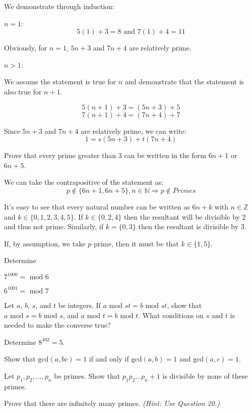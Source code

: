 \documentclass[11pt,largemargins]{homework}
\begin{document}
\quad We demonstrate through induction:

\quad $n=1$:
$$5(1)+3=8\text{ and } 7(1)+4=11$$

\quad Obviously, for $n=1$, $5n+3$ and $7n+4$ are relatively prime.

\quad $n>1$:

\quad We assume the statement is true for $n$ and demonstrate that the statement is also true for $n+1$.

$$5(n+1)+3 = (5n+3)+5$$
$$7(n+1)+4 = (7n+4)+7$$

\quad Since $5n+3$ and $7n+4$ are relatively prime, we can write:
$$1 = s(5n+3)+t(7n+4)$$

\question 
Prove that every prime greater than 3 can be written in the form $6n+1$ or $6n+5$.

\quad We can take the contrapositive of the statement as:
$$p \notin \{6n+1, 6n+5\}, n\in\mathbb{N} \Rightarrow p \notin Primes$$

\quad It's easy to see that every natural number can be written as $6n+k$ with $n \in \mathbb{Z}$ and 
$k \in \{0,1,2,3,4,5\}$. If $k\in\{0,2,4\}$ then the resultant will be divisible by 2 and thus not prime.
Similarly, if $k=\{0,3\}$ then the resultant is divisible by 3.

\quad If, by assumption, we take $p$ prime, then it must be that $k\in\{1,5\}$.

\question 
Determine 

\begin{alphaparts}
    \questionpart 
    $7^{1000} = \text{ mod }6$

    \questionpart 
    $6^{1001} = \text{ mod }7$
\end{alphaparts}

\question 
Let $a$, $b$, $s$, and $t$ be integers. If $a\text{ mod }st=b\text{ mod }st$, show that 
$a\text{ mod }s=b\text{ mod }s$, and $a\text{ mod }t=b\text{ mod }t$. What conditions on $s$ and $t$ 
is needed to make the converse true?

\question 
Determine $8^{402}=5$.

\question 
Show that $\text{gcd}(a,bc)=1$ if and only if $\text{gcd}(a,b)=1$ and $\text{gcd}(a,c)=1$.

\question 
Let $p_1,p_2,...,p_n$ be primes. Show that $p_1p_2...p_n+1$ is divisible by none of these primes.

\question 
Prove that there are infinitely many primes. \textit{(Hint: Use Question 20.)}
\end{document}
